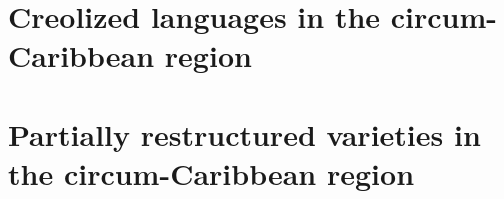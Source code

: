 \documentclass[output=book,collection
		  ]{langscibook}
\begin{document}
\maketitle
\frontmatter

{\sloppy\tableofcontents}


\mainmatter
\renewcommand{\lsChapterFooterSize}{\footnotesize}

\part{Creolized languages in the circum-Caribbean region}

\renewcommand{\lsChapterFooterSize}{\scriptsize}
\renewcommand{\lsChapterFooterSize}{\footnotesize}
\renewcommand{\lsChapterFooterSize}{\scriptsize}

\part{Partially restructured varieties in the circum-Caribbean region}

\renewcommand{\lsChapterFooterSize}{\footnotesize}

\end{document}
